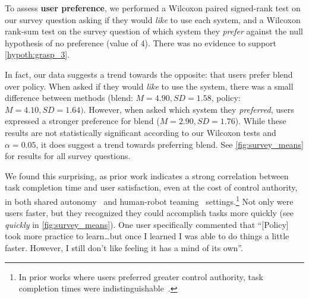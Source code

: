 
To assess \textbf{user preference}, we performed a Wilcoxon paired signed-rank test on our survey question asking if they would \emph{like} to use each system, and a Wilcoxon rank-sum test on the survey question of which system they \emph{prefer} against the null hypothesis of no preference (value of 4). There was no evidence to support \cref{hypoth:grasp_3}.

In fact, our data suggests a trend towards the opposite: that users prefer blend over policy. When asked if they would \emph{like} to use the system, there was a small difference between methods (blend: $M=4.90, SD=1.58$, policy: $M=4.10, SD=1.64)$. However, when asked which system they \emph{preferred}, users expressed a stronger preference for blend ($M=2.90, SD=1.76$). While these results are not statistically significant according to our Wilcoxon tests and $\alpha=0.05$, it does suggest a trend towards preferring blend. See \cref{fig:survey_means} for results for all survey questions.


We found this surprising, as prior work indicates a strong correlation between task completion time and user satisfaction, even at the cost of control authority, in both shared autonomy~\citep{dragan_2013_assistive, hauser_2013} and human-robot teaming~\citep{gombolay_2014} settings.\footnote{In prior works where users preferred greater control authority, task completion times were indistinguishable~\citep{kim_2012}.} Not only were users faster, but they recognized they could accomplish tasks more quickly (see \emph{quickly} in \cref{fig:survey_means}). One user specifically commented that  ``[Policy] took more practice to learn\ldots but once I learned I was able to do things a little faster. However, I still don't like feeling it has a mind of its own''. 


